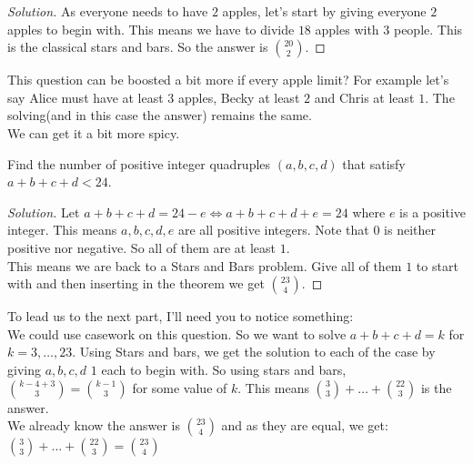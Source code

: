 \begin{proof}
    [Solution]
    As everyone needs to have $2$ apples, let's start by giving everyone $2$ apples to begin with. This means we have to divide $18$ apples with $3$ people. This is the classical stars and bars. So the answer is $\binom{20}{2}$.
\end{proof}
This question can be boosted a bit more if every apple limit? For example let's say Alice must have at least $3$ apples, Becky at least $2$ and Chris at least $1$. The solving(and in this case the answer) remains the same.\\
We can get it a bit more spicy.\\
\begin{example}
    Find the number of positive integer quadruples $(a, b, c, d)$ that satisfy $a+b+c+d<24$.
\end{example}
\begin{proof}
    [Solution]
    Let $a+b+c+d=24-e \iff a+b+c+d+e=24$ where $e$ is a positive integer. This means $a,b,c,d,e$ are all positive integers. Note that $0$ is neither positive nor negative. So all of them are at least $1$.\\
    This means we are back to a Stars and Bars problem. Give all of them $1$ to start with and then inserting in the theorem we get $\binom{23}{4}$.
\end{proof}
To lead us to the next part, I'll need you to notice something:\\
We could use casework on this question. So we want to solve $a+b+c+d=k$ for $k=3,\dots,23$. Using Stars and bars, we get the solution to each of the case by giving $a,b,c,d$ $1$ each to begin with. So using stars and bars, $\binom{k-4+3}{3}=\binom{k-1}{3}$ for some value of $k$. This means $\binom{3}{3}+\dots+\binom{22}{3}$ is the answer.\\
We already know the answer is $\binom{23}{4}$ and as they are equal, we get: $\binom{3}{3}+\dots+\binom{22}{3} = \binom{23}{4}$\\
